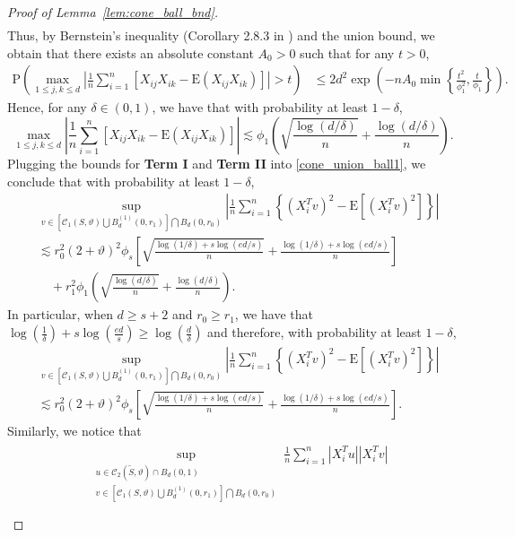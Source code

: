 \documentclass[ejsv2,noshowframe]{imsart}
\theoremstyle{plain}
\theoremstyle{definition}
\theoremstyle{remark}
\renewcommand{\tilde}{\widetilde}
\begin{document}
\begin{proof}[Proof of Lemma~\ref{lem:cone_ball_bnd}]
\begin{align*}
	\end{align*}
	Thus, by Bernstein's inequality (Corollary 2.8.3 in \citealt{vershynin2018high}) and the union bound, we obtain that there exists an absolute constant $A_0>0$ such that for any $t>0$,
	\begin{align*}
		\mathrm{P}\left(\max_{1\leq j, k \leq d} \left|\frac{1}{n} \sum_{i=1}^n \left[ X_{ij}X_{ik} - \mathrm{E}\left(X_{ij}X_{ik}\right)\right]\right| > t\right) &\leq 2d^2 \exp\left(-nA_0 \min\left\{\frac{t^2}{\phi_1^2}, \frac{t}{\phi_1}\right\}\right).
	\end{align*}
	Hence, for any $\delta \in (0,1)$, we have that with probability at least $1-\delta$,
	$$\max_{1\leq j, k \leq d} \left|\frac{1}{n} \sum_{i=1}^n \left[ X_{ij}X_{ik} - \mathrm{E}\left(X_{ij}X_{ik}\right)\right]\right| \lesssim \phi_1 \left(\sqrt{\frac{\log(d/\delta)}{n}} + \frac{\log(d/\delta)}{n}\right).$$
	Plugging the bounds for \textbf{Term I} and \textbf{Term II} into \eqref{cone_union_ball1}, we conclude that with probability at least $1-\delta$,
	\begin{align*}
		&\sup_{v\in \left[\mathcal{C}_1(S,\vartheta) \bigcup B_d^{(1)}(0,r_1) \right] \bigcap B_d(0,r_0)} \left|\frac{1}{n} \sum_{i=1}^n \left\{(X_i^Tv)^2 - \mathrm{E}\left[(X_i^Tv)^2\right] \right\}\right| \\
		&\lesssim r_0^2 (2+\vartheta)^2 \phi_s\left[\sqrt{\frac{\log(1/\delta) + s\log(ed/s)}{n}} + \frac{\log(1/\delta) + s\log(ed/s)}{n} \right] \\
		&\quad + r_1^2\phi_1 \left(\sqrt{\frac{\log(d/\delta)}{n}} + \frac{\log(d/\delta)}{n}\right).
	\end{align*}
	In particular, when $d\geq s+2$ and $r_0 \geq r_1$, we have that $\log\left(\frac{1}{\delta}\right) + s\log\left(\frac{ed}{s}\right) \geq \log\left(\frac{d}{\delta}\right)$ and therefore, with probability at least $1-\delta$,
	\begin{align*}
		&\sup_{v\in \left[\mathcal{C}_1(S,\vartheta) \bigcup B_d^{(1)}(0,r_1) \right] \bigcap B_d(0,r_0)} \left|\frac{1}{n} \sum_{i=1}^n \left\{(X_i^Tv)^2 - \mathrm{E}\left[(X_i^Tv)^2\right] \right\}\right| \\
		&\lesssim r_0^2 (2+\vartheta)^2 \phi_s\left[\sqrt{\frac{\log(1/\delta) + s\log(ed/s)}{n}} + \frac{\log(1/\delta)  + s\log(ed/s)}{n} \right].
	\end{align*}
	Similarly, we notice that
	\begin{align}
		\label{cone_union_ball2}
		\begin{split}
			&\sup_{\substack{u \in \mathcal{C}_2(\tilde{S},\vartheta) \cap B_d(0,1)\\v\in \left[\mathcal{C}_1(S,\vartheta) \bigcup B_d^{(1)}(0,r_1) \right] \bigcap B_d(0,r_0)}} \frac{1}{n} \sum_{i=1}^n \left|X_i^Tu\right| \left|X_i^Tv\right| \\

\end{split}
\end{align}
\end{proof}
\end{document}
